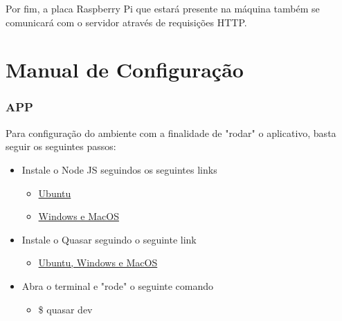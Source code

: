\begin{apendicesenv}
Por fim, a placa Raspberry Pi que estará presente na máquina também se comunicará com
o servidor através de requisições HTTP.

\chapter{Manual de Configuração}

\subsection{APP}

Para configuração do ambiente com a finalidade de "rodar" o aplicativo, basta seguir os seguintes passos:
\begin{itemize}
    \item{Instale o Node JS seguindos os seguintes links}
        \begin{itemize}
            \item{}\href{https://www.digitalocean.com/community/tutorials/how-to-install-node-js-on-ubuntu-16-04}{Ubuntu}
            \item{} \href{https://nodejs.org/en/download/}{Windows e MacOS}
        \end{itemize}
    \item{Instale o Quasar seguindo o seguinte link}
        \begin{itemize}
            \item{} \href{https://quasar-framework.org/guide/}{Ubuntu, Windows e MacOS}
        \end{itemize}
    \item{Abra o terminal e "rode" o seguinte comando}
        \begin{itemize}
            \item{} \$ quasar dev
        \end{itemize}
\end{itemize}



\end{apendicesenv}
